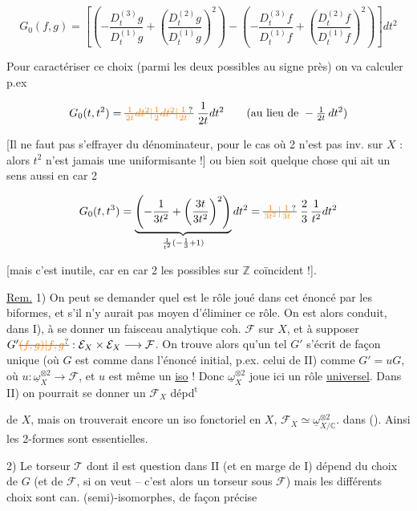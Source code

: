 \[
G_0(f,g)=\left[\left(-\frac{D_t^{(3)}g}{D_t^{(1)}g}+\left(\frac{D_t^{(2)}g}{D_t^{(1)}g}\right)^2\right)
-\left(-\frac{D_t^{(3)}f}{D_t^{(1)}f}+\left(\frac{D_t^{(2)}f}{D_t^{(1)}f}\right)^2\right)\right]dt^2
\]

Pour caractériser ce choix (parmi les deux possibles au signe près) on va calculer p.ex

\[
G_0(t,t^2)=\deleted{\unsure{\frac1{2t}dt^2|\frac1{2}dt^2|\frac1{2t}}}\ \frac1{2t}dt^2\qquad
\text{(au lieu de }-\tfrac1{2t}\,dt^2\text{)}
\]

[Il ne faut pas s'effrayer du dénominateur, pour le cas où 2 n'est pas inv. sur $X$ : alors $t^2$ n'est jamais une uniformisante !] ou bien soit quelque chose qui ait un sens aussi en car 2

\[
G_0(t,t^3)=\underbrace{\left(-\frac1{3t^2}+\left(\frac{3t}{3t^2}\right)^2\right)}_{\frac1{t^2}(-\frac13+1)}dt^2
=\deleted{\unsure{\frac1{3t^2}|\frac1{3t}}}\ \frac23\,\frac1{t^2}dt^2
\]

[mais c'est inutile, car en car 2 les   possibles sur $\mathbb Z$ coïncident !].

\uline{Rem.} 1) On peut se demander quel est le rôle joué dans cet énoncé par les biformes, et s'il n'y aurait pas moyen d'éliminer ce rôle. On est alors conduit, dans I), à se donner un faisceau analytique coh. $\mathcal F$ sur $X$, et à supposer $G'\deleted{\unsure{(f,g)|f,g}}:\mathcal E_X\times\mathcal E_X\longrightarrow\mathcal F$. On trouve alors qu'un tel $G'$ s'écrit de façon unique (où $G$ est comme dans l'énoncé initial, p.ex. celui de II) comme $G'=uG$, où $u:\underline\omega_X^{\otimes2}\longrightarrow\mathcal F$, et $u$ est même un \uline{iso} ! Donc $\underline\omega_X^{\otimes2}$ joue ici un rôle \uline{universel}. Dans II) on pourrait se donner un $\mathcal F_X$ dépd$^{\mathrm{t}}$


 de $X$, mais on trouverait encore un iso fonctoriel en $X$, $\mathcal F_X\simeq\underline\omega^{\otimes2}_{X/\mathbb C}$.   dans (). Ainsi les 2-formes sont essentielles.

2)  Le torseur $\mathcal T$ dont il est question dans II (et en marge de I) dépend du choix de $G$ (et de $\mathcal F$, si on veut -- c'est alors un torseur sous $\mathcal F$) mais les  différents choix sont can. (semi)-isomorphes, de façon précise

